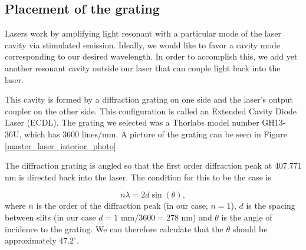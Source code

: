 

\subsection{Placement of the grating}



Lasers work by amplifying light resonant with a particular mode of the laser cavity via stimulated emission. Ideally, we would like to favor a cavity mode corresponding to our desired wavelength. In order to accomplish this, we add yet another resonant cavity outside our laser that can couple light back into the laser. 

This cavity is formed by a diffraction grating on one side and the laser's output coupler on the other side. This configuration is called an Extended Cavity Diode Laser (ECDL). The grating we selected was a Thorlabs model number GH13-36U, which has 3600 lines/mm. A picture of the grating can be seen in Figure\,\ref{master_laser_interior_photo}. 

The diffraction grating is angled so that the first order diffraction peak at 407.771 nm is directed back into the laser. The condition for this to be the case is 

\begin{equation} \label{gratingEQn}
n \lambda = 2 d \sin (\theta),
\end{equation}
where $n$ is the order of the diffraction peak (in our case, $n=1$), $d$ is the spacing between slits (in our case $d=1$ mm$/3600 = 278 $ nm) and $\theta$ is the angle of incidence to the grating. We can therefore calculate that the $\theta$ should be approximately
\href{http://www.wolframalpha.com/input/?i=arcsin%28+407.771+nm+%2F%282*%281+mm%2F3600%29%29%29+in+degrees}{$47.2^\circ$}.

